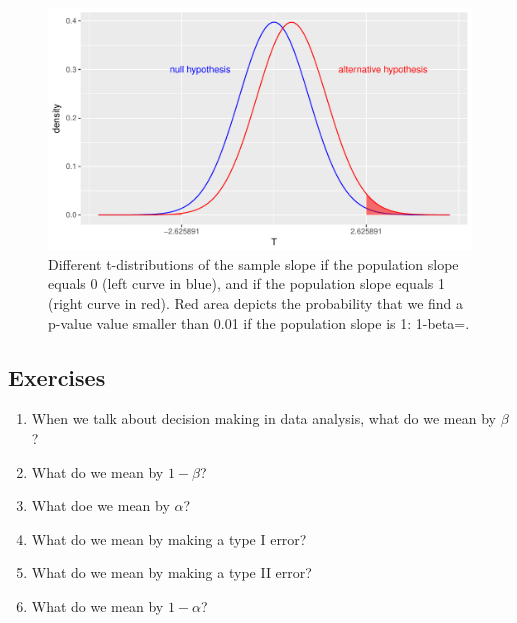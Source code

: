 \documentclass[]{report}\usepackage[]{graphicx}\usepackage[]{color}
\makeatletter
\def\maxwidth{ %
  \ifdim\Gin@nat@width>\linewidth
    \linewidth
  \else
    \Gin@nat@width
  \fi
}
\newenvironment{knitrout}{}{} %
\makeatother
\begin{document}
\begin{knitrout}
\color{fgcolor}\begin{figure}

{\centering \includegraphics[width=\maxwidth]{figure/inf_23-1} 

}

\caption[Different t-distributions of the sample slope if the population slope equals 0 (left curve in blue), and if the population slope equals 1 (right curve in red)]{Different t-distributions of the sample slope if the population slope equals 0 (left curve in blue), and if the population slope equals 1 (right curve in red). Red area depicts the probability that we find a p-value value smaller than 0.01 if the population slope is 1: 1-beta=.}\label{fig:inf_23}
\end{figure}


\end{knitrout}


\subsection{Exercises}

\begin{enumerate}

\item When we talk about decision making in data analysis, what do we mean by $\beta$?

\item What do we mean by $1-\beta$?

\item What doe we mean by $\alpha$?

\item What do we mean by making a type I error?

\item What do we mean by making a type II error?

\item What do we mean by $1-\alpha$?


\end{enumerate}
\end{document}
